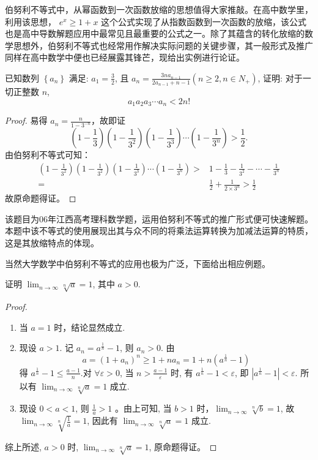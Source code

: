 伯努利不等式中，从幂函数到一次函数放缩的思想值得大家推敲。在高中数学里，利用该思想， $e^{x} \geq 1+x$ 这个公式实现了从指数函数到一次函数的放缩，该公式也是高中导数解题应用中最常见且最重要的公式之一。除了其蕴含的转化放缩的数学思想外，伯努利不等式也经常用作解决实际问题的关键步骤，其一般形式及推广同样在高中数学中便也已经展露其锋芒，现给出实例进行论证。


\begin{example}
  已知数列 $\left\{a_{n}\right\}$ 满足: $a_{1}=\frac{3}{2}$, 且 $a_{n}=\frac{3 n a_{n-1}}{2 a_{n-1}+n-1}\left(n \geq 2, n \in N_{+}\right)$, 证明: 对于一切正整数 $n$, 
  \[a_{1} a_{2} a_{3} \cdots a_{n}<2 n!\]
\end{example}

\begin{proof}
  易得 $a_{n}=\frac{n}{1-3^{-n}}$，故即证 \[\left(1-\frac{1}{3}\right)\left(1-\frac{1}{3^{2}}\right)\left(1-\frac{1}{3^{3}}\right) \cdots\left(1-\frac{1}{3^{n}}\right)>\frac{1}{2}.\]
  由伯努利不等式可知：
  \begin{align*}
    \left(1-\frac{1}{3^{2}}\right)\left(1-\frac{1}{3^{2}}\right)\left(1-\frac{1}{3^{3}}\right) \cdots\left(1-\frac{1}{3^{n}}\right)>&1-\frac{1}{3}-\frac{1}{3^{2}}-\cdots-\frac{1}{3^{n}} \\
    =& \frac{1}{2}+\frac{1}{2 \times 3^{n}}>\frac{1}{2}
  \end{align*}
  故原命题得证。
\end{proof}

\begin{analysis}
  该题目为06年江西高考理科数学题，运用伯努利不等式的推广形式便可快速解题。本题中该不等式的使用展现出其与众不同的将乘法运算转换为加减法运算的特质，这是其放缩特点的体现。
\end{analysis}

当然大学数学中伯努利不等式的应用也极为广泛，下面给出相应例题。


\begin{example}
  \parencite{华东师大数学分析} 证明 $\lim _{n \rightarrow \infty} \sqrt[n]{a}=1$, 其中 $a>0$. 
\end{example}

\begin{proof}
  \begin{enumerate}
    \item 当 $a=1$ 时，结论显然成立.
    \item 现设 $a>1$. 记 $a_{n}=a^{\frac{1}{n}}-1$, 则 $a_{n}>0$. 由
      \[
        a=\left(1+a_{n}\right)^{n} \geq 1+n a_{n}=1+n\left(a^{\frac{1}{n}}-1\right)
      \]
      得 $a^{\frac{1}{n}}-1 \leq \frac{a-1}{n}$.对 $\forall \varepsilon>0$, 当 $n>\frac{a-1}{\varepsilon}$ 时, 有 $a^{\frac{1}{n}}-1<\varepsilon$, 即 $\left|a^{\frac{1}{n}}-1\right|<\varepsilon$. 所以有 $\lim _{n \rightarrow \infty} \sqrt[n]{a}=1$ 成立.
      \item 现设 $0<a<1$, 则 $\frac{1}{a}>1$ 。由上可知, 当 $b>1$ 时，$\lim _{n \rightarrow \infty} \sqrt[n]{b}=1$, 故 $\lim _{n \rightarrow \infty} \sqrt[n]{\frac{1}{a}}=1$, 因此有 $\lim _{n \rightarrow \infty} \sqrt[n]{a}=1$ 成立.
  \end{enumerate}

  综上所述, $a>0$ 时, $\lim _{n \rightarrow \infty} \sqrt[n]{a}=1$, 原命题得证。
\end{proof}


